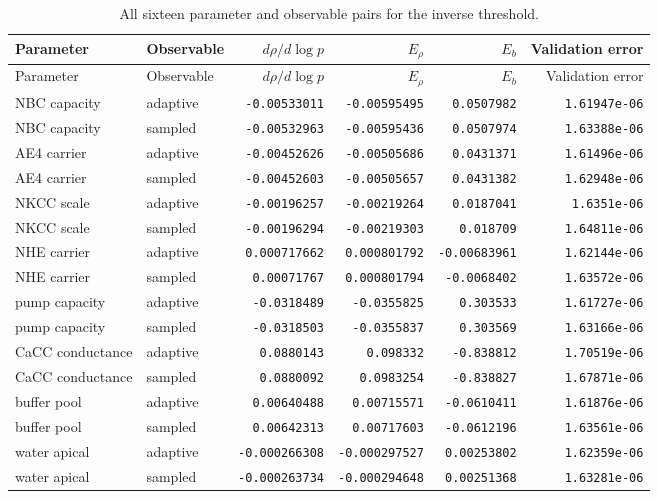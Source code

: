 \begingroup\scriptsize
\setlength{\tabcolsep}{3pt}
\begin{longtable}{p{.25\linewidth}lrrrr}
\caption{All sixteen parameter and observable pairs for the inverse threshold.}\\
\toprule
Parameter & Observable & $d\rho/d\log p$ & $E_\rho$ & $E_b$ & Validation error \\
\midrule\endfirsthead
\toprule
Parameter & Observable & $d\rho/d\log p$ & $E_\rho$ & $E_b$ & Validation error \\
\midrule\endhead
\bottomrule\endfoot
NBC capacity & adaptive & \texttt{-0.00533011} & \texttt{-0.00595495} & \texttt{0.0507982} & \texttt{1.61947e-06} \\
NBC capacity & sampled & \texttt{-0.00532963} & \texttt{-0.00595436} & \texttt{0.0507974} & \texttt{1.63388e-06} \\
AE4 carrier & adaptive & \texttt{-0.00452626} & \texttt{-0.00505686} & \texttt{0.0431371} & \texttt{1.61496e-06} \\
AE4 carrier & sampled & \texttt{-0.00452603} & \texttt{-0.00505657} & \texttt{0.0431382} & \texttt{1.62948e-06} \\
NKCC scale & adaptive & \texttt{-0.00196257} & \texttt{-0.00219264} & \texttt{0.0187041} & \texttt{1.6351e-06} \\
NKCC scale & sampled & \texttt{-0.00196294} & \texttt{-0.00219303} & \texttt{0.018709} & \texttt{1.64811e-06} \\
NHE carrier & adaptive & \texttt{0.000717662} & \texttt{0.000801792} & \texttt{-0.00683961} & \texttt{1.62144e-06} \\
NHE carrier & sampled & \texttt{0.00071767} & \texttt{0.000801794} & \texttt{-0.0068402} & \texttt{1.63572e-06} \\
pump capacity & adaptive & \texttt{-0.0318489} & \texttt{-0.0355825} & \texttt{0.303533} & \texttt{1.61727e-06} \\
pump capacity & sampled & \texttt{-0.0318503} & \texttt{-0.0355837} & \texttt{0.303569} & \texttt{1.63166e-06} \\
CaCC conductance & adaptive & \texttt{0.0880143} & \texttt{0.098332} & \texttt{-0.838812} & \texttt{1.70519e-06} \\
CaCC conductance & sampled & \texttt{0.0880092} & \texttt{0.0983254} & \texttt{-0.838827} & \texttt{1.67871e-06} \\
buffer pool & adaptive & \texttt{0.00640488} & \texttt{0.00715571} & \texttt{-0.0610411} & \texttt{1.61876e-06} \\
buffer pool & sampled & \texttt{0.00642313} & \texttt{0.00717603} & \texttt{-0.0612196} & \texttt{1.63561e-06} \\
water apical & adaptive & \texttt{-0.000266308} & \texttt{-0.000297527} & \texttt{0.00253802} & \texttt{1.62359e-06} \\
water apical & sampled & \texttt{-0.000263734} & \texttt{-0.000294648} & \texttt{0.00251368} & \texttt{1.63281e-06} \\
\end{longtable}
\endgroup


